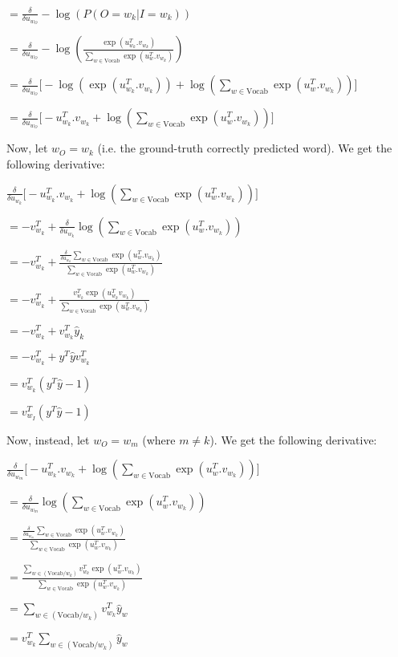 \begin{solution}
$= \frac{\delta}{\delta u_{w_O}} -\log(P(O = w_k \vert I = w_k))$

$= \frac{\delta}{\delta u_{w_O}} -\log(\frac{\exp(u_{w_k}^T . v_{w_k})}{\sum_{w \in \text{Vocab}} \exp(u_{w}^T . v_{w_k})})$

$= \frac{\delta}{\delta u_{w_O}} \big[ -\log(\exp(u_{w_k}^T . v_{w_k})) + \log(\sum_{w \in \text{Vocab}} \exp(u_{w}^T . v_{w_k})) \big]$

$= \frac{\delta}{\delta u_{w_O}} \big[ -u_{w_k}^T . v_{w_k} + \log(\sum_{w \in \text{Vocab}} \exp(u_{w}^T . v_{w_k})) \big]$

Now, let $w_O = w_k$ (i.e. the ground-truth correctly predicted word). We get the following derivative:

$\frac{\delta}{\delta u_{w_k}} \big[ -u_{w_k}^T . v_{w_k} + \log(\sum_{w \in \text{Vocab}} \exp(u_{w}^T . v_{w_k})) \big]$

$= -v_{w_k}^T + \frac{\delta}{\delta u_{w_k}}\log(\sum_{w \in \text{Vocab}} \exp(u_{w}^T . v_{w_k}))$

$= -v_{w_k}^T + \frac{\frac{\delta}{\delta u_{w_k}} \sum_{w \in \text{Vocab}} \exp(u_{w}^T . v_{w_k})}{\sum_{w \in \text{Vocab}} \exp(u_{w}^T . v_{w_k})}$

$= -v_{w_k}^T + \frac{v_{w_k}^T\exp(u_{w_k}^Tv_{w_k})}{\sum_{w \in \text{Vocab}} \exp(u_{w}^T . v_{w_k})}$

$= -v_{w_k}^T + v_{w_k}^T\hat{y}_k$

$= -v_{w_k}^T + y^T\hat{y} v_{w_k}^T$

$= v_{w_k}^T(y^T\hat{y} - 1)$

$= v_{w_I}^T(y^T\hat{y} - 1)$

Now, instead, let $w_O = w_m$ (where $m \neq k$). We get the following derivative:

$\frac{\delta}{\delta u_{w_m}} \big[ -u_{w_k}^T . v_{w_k} + \log(\sum_{w \in \text{Vocab}} \exp(u_{w}^T . v_{w_k})) \big]$

$= \frac{\delta}{\delta u_{w_m}}\log(\sum_{w \in \text{Vocab}} \exp(u_{w}^T . v_{w_k}))$

$= \frac{\frac{\delta}{\delta u_{w_m}} \sum_{w \in \text{Vocab}} \exp(u_{w}^T . v_{w_k})}{\sum_{w \in \text{Vocab}} \exp(u_{w}^T . v_{w_k})}$

$= \frac{\sum_{w \in (\text{Vocab}/w_k)} v_{w_k}^T\exp(u_{w}^T . v_{w_k})}{\sum_{w \in \text{Vocab}} \exp(u_{w}^T . v_{w_k})}$

$= \sum_{w \in (\text{Vocab}/w_k)} v_{w_k}^T \hat{y}_w$

$= v_{w_k}^T \sum_{w \in (\text{Vocab}/w_k)} \hat{y}_w$


\end{solution}
